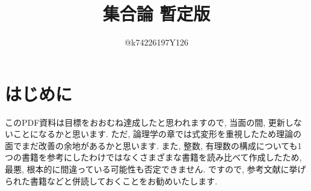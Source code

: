 \documentclass[10pt,a4paper,titlepage]{jsarticle}
\title{集合論 暫定版}
\author{@k74226197Y126}
\begin{document}
\maketitle
{}
\section*{はじめに}
\par
このPDF資料は目標をおおむね達成したと思われますので, 当面の間, 更新しないことになるかと思います. ただ, 論理学の章では式変形を重視したため理論の面でまだ改善の余地があるかと思います. また, 整数, 有理数の構成についても1つの書籍を参考にしたわけではなくさまざまな書籍を読み比べて作成したため, 最悪, 根本的に間違っている可能性も否定できません. ですので, 参考文献に挙げられた書籍などと併読しておくことをお勧めいたします. \par
{}
\tableofcontents
\clearpage
{}


\clearpage


\clearpage

\clearpage

\clearpage

\clearpage

\clearpage

\clearpage

\clearpage

\clearpage

\clearpage


\clearpage

\clearpage

\end{document}
